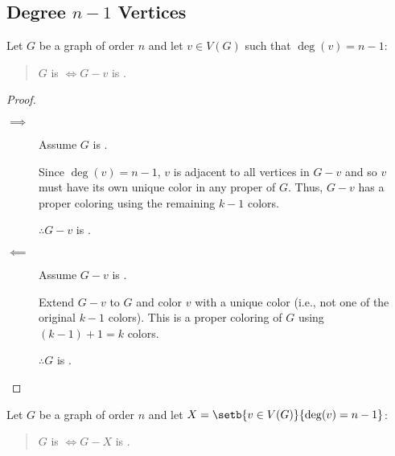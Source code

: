 \subsection{Degree \(n-1\) Vertices}

\begin{lemma}
  \label{lem:adjall}
  Let \(G\) be a graph of order \(n\) and let \(v\in V(G)\) such that \(\deg(v)=n-1\):
  \begin{quote}
    \(G\) is  \(\iff G-v\) is .
  \end{quote}
\end{lemma}

\begin{proof}
  \begin{description}
  \item[]
  \item[\(\implies\)] Assume \(G\) is .

    Since \(\deg(v)=n-1\), \(v\) is adjacent to all vertices in \(G-v\) and so \(v\) must have its own unique color in any
    proper  of \(G\).  Thus, \(G-v\) has a proper coloring using the remaining \(k-1\) colors.

    \(\therefore G-v\) is .
    
  \item[\(\impliedby\)] Assume \(G-v\) is .

    Extend \(G-v\) to \(G\) and color \(v\) with a unique color (i.e., not one of the original \(k-1\) colors).  This is a
    proper coloring of \(G\) using \((k-1)+1=k\) colors.

    \(\therefore G\) is .
  \end{description}
\end{proof}

\begin{corollary}
  \label{cor:adjall}
  Let \(G\) be a graph of order \(n\) and let \(X=\setb{v\in V(G)}{\deg(v)=n-1}\):
  \begin{quote}
    \(G\) is  \(\iff G-X\) is .
  \end{quote}
\end{corollary}

